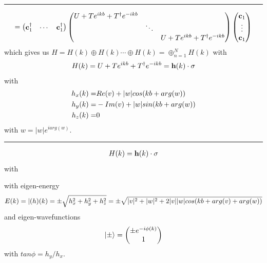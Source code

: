 \documentclass[letterpaper,10pt,english]{sphinxmanual}
\begin{document}
\bigskip\hrule{}\bigskip

\begin{gather}
\begin{split}=\begin{pmatrix}\mathbf{c}_1^\dagger&\cdots&\mathbf{c}_1^\dagger \end{pmatrix}
\begin{pmatrix} U+Te^{ikb}+T^\dagger e^{-ikb} & &\\
&\ddots&\\
&&U+Te^{ikb}+T^\dagger e^{-ikb}
\end{pmatrix}
\begin{pmatrix}\mathbf{c}_1\\\vdots\\\mathbf{c}_1\end{pmatrix}\end{split}\notag
\end{gather}
which gives us
\(H=H(k)\oplus H(k)\cdots \oplus H(k)=\oplus_{n=1}^N H(k)\) with
\begin{gather}
\begin{split}H(k)=U+Te^{ikb}+T^\dagger e^{-ikb}=\mathbf{h}(k)\cdot \mathbf{\sigma}\end{split}\notag
\end{gather}
with
\begin{gather}
\begin{split}h_x(k)=&Re(v)+|w|cos(kb+arg(w))\\
h_y(k)=&-Im(v)+|w|sin(kb+arg(w))\\
h_z(k)=&0\end{split}\notag
\end{gather}
with \(w=|w|e^{i arg(w)}\).


\bigskip\hrule{}\bigskip

\begin{gather}
\begin{split}H(k)=\mathbf{h}(k)\cdot \mathbf{\sigma}\end{split}\notag
\end{gather}
with

with eigen-energy
\begin{gather}
\begin{split}E(k)=|\mathbf(h)(k)=\pm \sqrt{h_x^2+h_y^2+h_z^2}=\pm \sqrt{|v|^2+|w|^2+2|v||w|cos(kb+arg(v)+arg(w))}\end{split}\notag
\end{gather}
and eigen-wavefunctions
\begin{gather}
\begin{split}|\pm\rangle=\begin{pmatrix}\pm e^{-i\phi(k)}\\
1\end{pmatrix}\end{split}\notag
\end{gather}
with \(tan\phi=h_y/h_x\).
\end{document}
